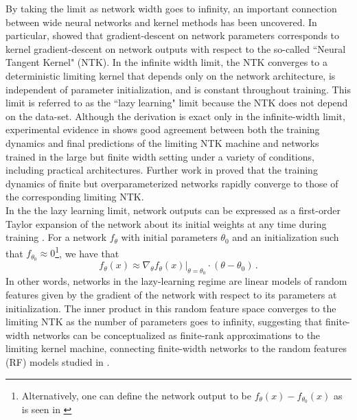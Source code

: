 \documentclass[a4paper, 12pt]{article}
\begin{document}
By taking the limit as network width goes to infinity, an important connection between wide neural networks and kernel methods has been uncovered. In particular, \cite{jacotNeuralTangentKernel2018} showed that gradient-descent on network parameters corresponds to kernel gradient-descent on network outputs with respect to the so-called ``Neural Tangent Kernel" (NTK). In the infinite width limit, the NTK converges to a deterministic limiting kernel that depends only on the network architecture, is independent of parameter initialization, and is constant throughout training. This limit is referred to as the ``lazy learning" limit because the NTK does not depend on the data-set. Although the derivation is exact only in the infinite-width limit, experimental evidence in \cite{jacotNeuralTangentKernel2018} shows good agreement between both the training dynamics and final predictions of the limiting NTK machine and networks trained in the large but finite width setting under a variety of conditions, including practical architectures. Further work in \cite{allen-zhuConvergenceTheoryDeep2019} proved that the training dynamics of finite but overparameterized networks rapidly converge to those of the corresponding limiting NTK.\\

In the the lazy learning limit, network outputs can be expressed as a first-order Taylor expansion of the network about its initial weights at any time during training \cite{leeWideNeuralNetworks2019}. For a network $f_\theta$ with initial parameters $\theta_0$ and an initialization such that $f_{\theta_0} \approx 0$\footnote{Alternatively, one can define the network output to be $f_{\theta}(x) - f_{\theta_0}(x)$ as is seen in \cite{chizatLazyTrainingDifferentiable2020}}, we have that
\begin{equation}
    f_\theta(x) \approx \nabla_\theta \left.f_\theta(x)\right|_{\theta=\theta_0} \cdot (\theta - \theta_0)\,.
\end{equation}
In other words, networks in the lazy-learning regime are linear models of random features given by the gradient of the network with respect to its parameters at initialization. The inner product in this random feature space converges to the limiting NTK as the number of parameters goes to infinity, suggesting that finite-width networks can be conceptualized as finite-rank approximations to the limiting kernel machine, connecting finite-width networks to the random features (RF) models studied in \cite{rahimiRandomFeaturesLargeScale2008}.
\end{document}
